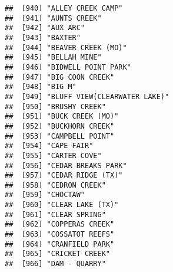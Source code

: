 \documentclass[
]{article}
\begin{document}
\begin{verbatim}
##  [940] "ALLEY CREEK CAMP"                                                                    
##  [941] "AUNTS CREEK"                                                                         
##  [942] "AUX ARC"                                                                             
##  [943] "BAXTER"                                                                              
##  [944] "BEAVER CREEK (MO)"                                                                   
##  [945] "BELLAH MINE"                                                                         
##  [946] "BIDWELL POINT PARK"                                                                  
##  [947] "BIG COON CREEK"                                                                      
##  [948] "BIG M"                                                                               
##  [949] "BLUFF VIEW(CLEARWATER LAKE)"                                                         
##  [950] "BRUSHY CREEK"                                                                        
##  [951] "BUCK CREEK (MO)"                                                                     
##  [952] "BUCKHORN CREEK"                                                                      
##  [953] "CAMPBELL POINT"                                                                      
##  [954] "CAPE FAIR"                                                                           
##  [955] "CARTER COVE"                                                                         
##  [956] "CEDAR BREAKS PARK"                                                                   
##  [957] "CEDAR RIDGE (TX)"                                                                    
##  [958] "CEDRON CREEK"                                                                        
##  [959] "CHOCTAW"                                                                             
##  [960] "CLEAR LAKE (TX)"                                                                     
##  [961] "CLEAR SPRING"                                                                        
##  [962] "COPPERAS CREEK"                                                                      
##  [963] "COSSATOT REEFS"                                                                      
##  [964] "CRANFIELD PARK"                                                                      
##  [965] "CRICKET CREEK"                                                                       
##  [966] "DAM - QUARRY"                                                                        

\end{verbatim}
\end{document}
